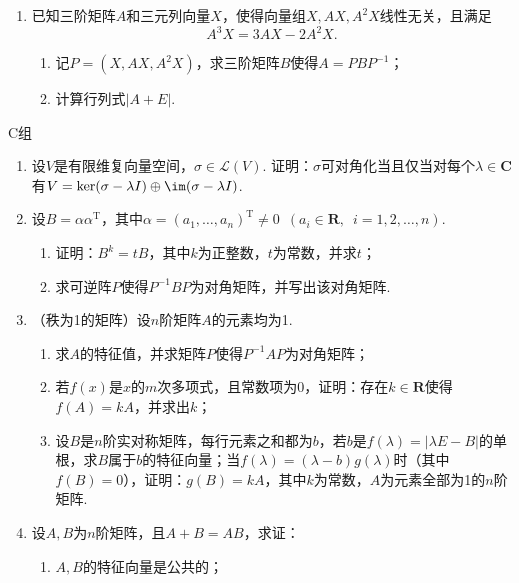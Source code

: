 \begin{enumerate}
    \item 已知三阶矩阵$A$和三元列向量$X$，使得向量组$X,AX,A^2X$线性无关，且满足
          \[A^3X=3AX-2A^2X.\]
          \begin{enumerate}
              \item 记$P=(X,AX,A^2X)$，求三阶矩阵$B$使得$A=PBP^{-1}$；

              \item 计算行列式$|A+E|$.
          \end{enumerate}
\end{enumerate}

\centerline{\heiti C组}
\begin{enumerate}
    \item 设$V$是有限维复向量空间，$\sigma\in \mathcal{L}(V)$. 证明：$\sigma$可对角化当且仅当对每个$\lambda\in\mathbf{C}$有$V=\ker(\sigma-\lambda I)\oplus\im(\sigma-\lambda I)$.

    \item 设$B=\alpha\alpha^\mathrm{T}$，其中$\alpha=(a_1,\ldots,a_n)^\mathrm{T}\neq 0\enspace(a_i\in\mathbf{R},\enspace i=1,2,\ldots,n)$.
          \begin{enumerate}
              \item 证明：$B^k=tB$，其中$k$为正整数，$t$为常数，并求$t$；

              \item 求可逆阵$P$使得$P^{-1}BP$为对角矩阵，并写出该对角矩阵.
          \end{enumerate}

    \item （秩为1的矩阵）设$n$阶矩阵$A$的元素均为1.
          \begin{enumerate}
              \item 求$A$的特征值，并求矩阵$P$使得$P^{-1}AP$为对角矩阵；

              \item 若$f(x)$是$x$的$m$次多项式，且常数项为0，证明：存在$k\in\mathbf{R}$使得$f(A)=kA$，并求出$k$；

              \item 设$B$是$n$阶实对称矩阵，每行元素之和都为$b$，若$b$是$f(\lambda)=|\lambda E-B|$的单根，求$B$属于$b$的特征向量；当$f(\lambda)=(\lambda-b)g(\lambda)$时（其中$f(B)=0$），证明：$g(B)=kA$，其中$k$为常数，$A$为元素全部为1的$n$阶矩阵.
          \end{enumerate}

    \item 设$A,B$为$n$阶矩阵，且$A+B=AB$，求证：
          \begin{enumerate}
              \item $A,B$的特征向量是公共的；


\end{enumerate}
\end{enumerate}
